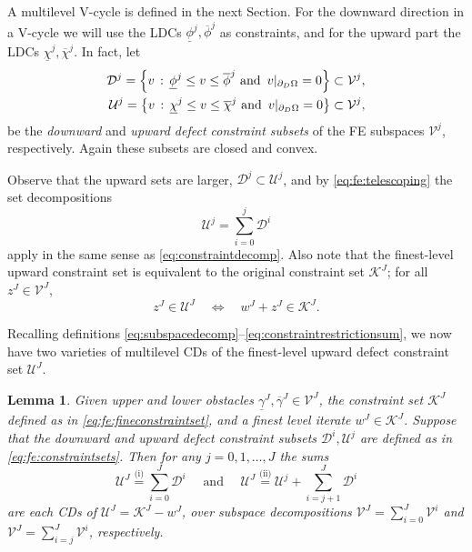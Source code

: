 \documentclass[letterpaper,final,12pt,reqno]{amsart}
\theoremstyle{cstyle}
\newtheorem{lemma}[theorem]{Lemma}
\theoremstyle{cstyle*}
\theoremstyle{dstyle}
\numberwithin{equation}{section}
\numberwithin{figure}{section}
\numberwithin{table}{section}
\numberwithin{theorem}{section}
\newcommand{\cK}{\mathcal{K}}
\newcommand{\cV}{\mathcal{V}}
\begin{document}
A multilevel V-cycle is defined in the next Section.  For the downward direction in a V-cycle we will use the LDCs $\underline{\phi}^j,\overline{\phi}^j$ as constraints, and for the upward part the LDCs $\underline{\chi}^j,\overline{\chi}^j$.  In fact, let
\begin{align}
\mathcal{D}^j = \left\{v \,:\, \underline{\phi}^j \le v \le \overline{\phi}^j \text{ and } \, v|_{\partial_D\Omega} = 0\right\} \subset \mathcal{V}^j, \label{eq:fe:constraintsets} \\
\mathcal{U}^j = \left\{v\,:\, \underline{\chi}^j \le v \le \overline{\chi}^j \text{ and } \, v|_{\partial_D\Omega} = 0\right\} \subset \mathcal{V}^j, \notag
\end{align}
be the \emph{downward} and \emph{upward defect constraint subsets} of the FE subspaces $\mathcal{V}^j$, respectively.  Again these subsets are closed and convex.

Observe that the upward sets are larger, $\mathcal{D}^j \subset \mathcal{U}^j$, and by \eqref{eq:fe:telescoping} the set decompositions
\begin{equation}
\mathcal{U}^j = \sum_{i=0}^j \mathcal{D}^i \label{eq:fe:constraintdecomp}
\end{equation}
apply in the same sense as \eqref{eq:constraintdecomp}.  Also note that the finest-level upward constraint set is equivalent to the original constraint set $\mathcal{K}^J$; for all $z^J \in \mathcal{V}^J$,
\begin{equation}
z^J \in \mathcal{U}^J \quad \iff \quad w^J+z^J \in \mathcal{K}^J. \label{eq:fe:finestlevelequivalent}
\end{equation}

Recalling definitions \eqref{eq:subspacedecomp}--\eqref{eq:constraintrestrictionsum}, we now have two varieties of multilevel CDs of the finest-level upward defect constraint set $\mathcal{U}^J$.

\begin{lemma}  Given upper and lower obstacles $\underline{\gamma}^J,\overline{\gamma}^J \in \cV^J$, the constraint set $\cK^J$ defined as in \eqref{eq:fe:fineconstraintset}, and a finest level iterate $w^J \in \cK^J$.  Suppose that the downward and upward defect constraint subsets $\mathcal{D}^i,\mathcal{U}^j$ are defined as in \eqref{eq:fe:constraintsets}.  Then for any $j=0,1,\dots,J$ the sums
\begin{equation}
\mathcal{U}^J \stackrel{\text{(i)}}{=} \sum_{i=0}^J \mathcal{D}^i \quad \text{ and } \quad  \mathcal{U}^J \stackrel{\text{(ii)}}{=} \mathcal{U}^j + \sum_{i={j+1}}^J \mathcal{D}^i
\end{equation}
are each CDs of $\mathcal{U}^J = \cK^J - w^J$, over subspace decompositions $\cV^J=\sum_{i=0}^J \cV^i$ and $\cV^J=\sum_{i=j}^J \cV^i$, respectively.
\end{lemma}
\end{document}
